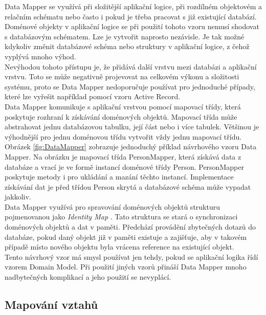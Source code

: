 \documentclass[ing,male,java,dept456]{diploma}						%
\begin{document}
Data Mapper se využívá při složitější aplikační logice, při rozdílném objektovém a relačním schématu nebo často i pokud je třeba pracovat s již existující databází. Doménové objekty v aplikační logice se při použití tohoto vzoru nemusí shodovat s databázovým schématem. Lze je vytvořit naprosto nezávisle. Je tak možné kdykoliv změnit databázové schéma nebo struktury v aplikační logice, z čehož vyplývá mnoho výhod. \\
Nevýhodou tohoto přístupu je, že přidává další vrstvu mezi databázi a aplikační vrstvu. Toto se může negativně projevovat na celkovém výkonu a složitosti systému, proto se Data Mapper nedoporučuje používat pro jednoduché případy, které lze vyřešit například pomocí vzoru Active Record.\\
Data Mapper komunikuje s aplikační vrstvou pomocí mapovací třídy, která poskytuje rozhraní k získávání doménových objektů. Mapovací třída může abstrahovat jednu databázovou tabulku, její část nebo i více tabulek. Většinou je výhodnější pro jednu doménovou třídu vytvořit vždy jednu mapovací třídu. \\
Obrázek \ref{fig:DataMapper} zobrazuje jednoduchý příklad návrhového vzoru Data Mapper. Na obrázku je  mapovací třída PersonMapper, která získává data z databáze a vrací je ve formě instancí doménové třídy Person. PersonMapper poskytuje metody i pro ukládání a mazání těchto instancí. Implementace získávání dat je před třídou Person skrytá a databázové schéma může vypadat jakkoliv. \\
Data Mapper využívá pro spravování doménových objektů strukturu pojmenovanou jako \textit{Identity Map} \cite{fowler}. Tato struktura se stará o synchronizaci doménových objektů a dat v paměti. Předchází provádění zbytečných dotazů do databáze, pokud daný objekt již v paměti existuje a zajišťuje, aby v takovém případě místo nového objektu byla vrácena reference na existující objekt. \\
Tento návrhový vzor má smysl používat jen tehdy, pokud se aplikační logika řídí vzorem Domain Model. Při použití jiných vzorů přináší Data Mapper mnoho nadbytečných komplikací a jeho použití se nevyplácí. \\


\subsection{Mapování vztahů}
\label{subsec:Relmapping}
\end{document}
